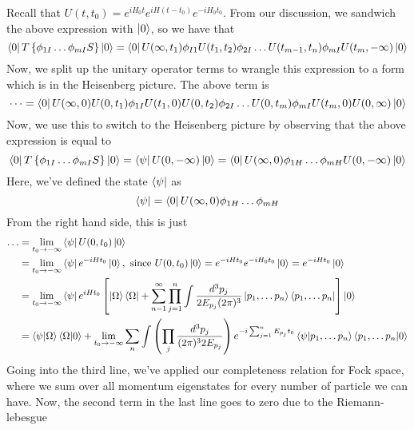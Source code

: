 Recall that $U ( t, t_0 ) = e ^{ i H_0 t } e^{ i H (  t- t_0 ) } e ^{  - i H_0 t_0 }$. 
From our discussion, we sandwich the above expression with 
$ \ket{ 0 } $, so we have that 
\[
\bra{ 0 } T \left\{  \phi_{ 1 I } \dots \phi _{ m I } S  \right\} \ket{ 0 } =  
\bra{ 0 } U ( \infty, t_1 ) \phi_{ I 1 } U ( t_1, t_2 ) \phi _{ 2 I } \dots U ( t_{ m-1 } , t _{ n } ) 
\phi _{ m I } U ( t_{ m } , - \infty ) \ket{ 0 } 
\] Now, we split up the unitary operator terms 
to wrangle this expression to a form 
which is in the Heisenberg picture. The above term 
is 
\[
	\dots = \bra{ 0 } U ( \infty, 0 ) U ( 0 , t_1 ) 
	\phi _{ 1 I } U ( t_1, 0 ) U ( 0 , t_2 ) \phi _{ 2 I } \dots 
	U ( 0 , t_m ) \phi _{ m I  } U ( t_ m , 0 ) U ( 0 , \infty ) \ket{ 0 } 
\]
Now, we use this to switch to the Heisenberg picture 
by observing that the above expression is equal to 
\[
	\bra{ 0 } T \left\{  \phi_{ 1 I } \dots \phi _{ m I } S  \right\} \ket{ 0 }  = \bra{ \psi} U ( 0 , - \infty ) \ket{0} = \bra{ 0 } U ( \infty, 0 ) \phi _{ 1H } \dots \phi _{ m H } U ( 0 ,  - \infty ) \ket{ 0 }
\] Here, we've defined 
the state $ \bra{ \psi } $ as
\[
	\bra{ \psi } = \bra{ 0 } U ( \infty, 0 ) \phi _{ 1H } \dots \phi _{ m H }
\] From the right hand side, this 
is just 
\begin{align*}
	\dots &=  \lim_{ t_0 \to - \infty } \bra{ \psi } U ( 0 , t_0 ) \ket{ 0 }  \\
	      &=  \lim_{ t_0 \to - \infty } \bra{ \psi } e ^{ -  i H t_0 } \ket{ 0 }, \text{ since } 
	      U ( 0 , t_0 ) \ket{ 0 } = e ^{ - i H t_0 } e ^{ - i H_0 t_0 } \ket{ 0 } = e ^{ - i H t_0 } \ket{ 0 }  \\
	&=  \lim_{ t_0 \to - \infty } \bra{ \psi } e^{ i H t_0 } \left[  \ket{ \Omega } 
	\bra{ \Omega } + \sum_{n=1}^{ \infty} \prod_{ j = 1 } ^ n \int \frac{d ^ 3 p_{ j} }{
2 E_{ p_{ j } } ( 2 \pi ) ^ 3  } \ket{ p_1 , \dots p_n } \bra{ p_1, \dots p_n }  \right] \ket{ 0 }  \\
	&=  \bra{ \psi }\ket{ \Omega } \bra{ \Omega }\ket{ 0 }  + \lim_{ t_0 \to - \infty } \sum_n \int \left( 
	\prod_ j \frac{ d^ 3 p _ j }{ ( 2 \pi ) ^ 3 2 E_{ p _{ j } } }  \right) 
	e^{ - i \sum_{ j = 1 } ^ n E_{ p _{ j } }  t_0 } \bra{ \psi }\ket{ p_1, \dots p_n }\bra{ p_1 , \dots p_n }\ket{ 0 } \\
\end{align*}
Going into the third line, we've applied our completeness 
relation for Fock space, where we sum over all momentum 
eigenstates for every number of particle we can have. 
Now, the second term in the last line goes to zero due to the Riemann-lebesgue 
